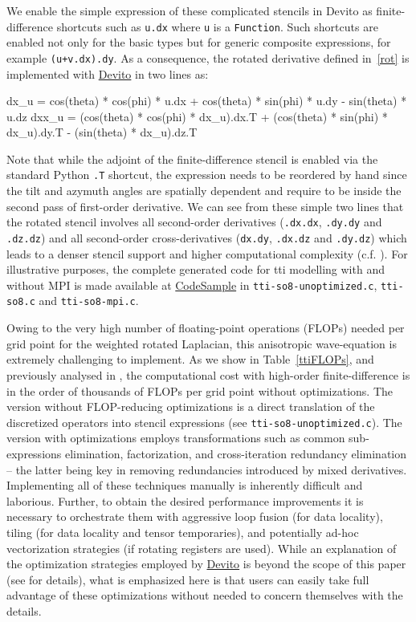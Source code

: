 \documentclass[10pt, conference]{IEEEtran}
\newcommand{\devito}{\href{https://github.com/devitocodes/devito}{Devito} }
\begin{document}
We enable the simple expression of these complicated stencils in Devito
as finite-difference shortcuts such as \texttt{u.dx} where \texttt{u} is
a \texttt{Function}. Such shortcuts are enabled not only for the basic
types but for generic composite expressions, for example
\texttt{(u\phantom{\ }+\phantom{\ }v.dx).dy}. As a consequence, the
rotated derivative defined in~\ref{rot} is implemented with \devito in two
lines as:

\begin{python}[label=rotxpy, caption=Rotated finite-difference with symbolic shortcuts]
dx_u = cos(theta) * cos(phi) * u.dx +
       cos(theta) * sin(phi) * u.dy -
       sin(theta) * u.dz
dxx_u = (cos(theta) * cos(phi) * dx_u).dx.T +
        (cos(theta) * sin(phi) * dx_u).dy.T -
        (sin(theta) * dx_u).dz.T
\end{python}

Note that while the adjoint of the finite-difference stencil is enabled via the
standard Python \texttt{.T} shortcut, the expression needs to be reordered by hand
since the tilt and azymuth angles are spatially dependent and require to be
inside the second pass of first-order derivative. We can see from these simple
two lines that the rotated stencil involves all second-order derivatives
(\texttt{.dx.dx}, \texttt{.dy.dy} and \texttt{.dz.dz}) and all second-order
cross-derivatives (\texttt{dx.dy}, \texttt{.dx.dz} and \texttt{.dy.dz}) which
leads to a denser stencil support and higher computational complexity
(c.f. \cite{louboutin2016ppf}). For illustrative purposes, the complete
generated code for tti modelling with and without MPI is made available
at \href{https://github.com/mloubout/SC20Paper/tree/master/codesamples}{CodeSample}
in \texttt{tti-so8-unoptimized.c}, \texttt{tti-so8.c} and \texttt{tti-so8-mpi.c}.

Owing to the very high number of floating-point operations (FLOPs) needed per
grid point for the weighted rotated Laplacian, this anisotropic wave-equation
is extremely challenging to implement. As we show in Table~\ref{ttiFLOPs}, and
previously analysed in \cite{louboutin2016ppf}, the computational cost with
high-order finite-difference is in the order of thousands of FLOPs per grid
point without optimizations. The version without FLOP-reducing optimizations is
a direct translation of the discretized operators into stencil expressions (see
\texttt{tti-so8-unoptimized.c}). The version with optimizations employs
transformations such as common sub-expressions elimination, factorization, and
cross-iteration redundancy elimination -- the latter being key in removing
redundancies introduced by mixed derivatives. Implementing all of these
techniques manually is inherently difficult and laborious. Further, to obtain
the desired performance improvements it is necessary to orchestrate them with
aggressive loop fusion (for data locality), tiling (for data locality and
tensor temporaries), and potentially ad-hoc vectorization strategies (if
rotating registers are used). While an explanation of the optimization
strategies employed by \devito is beyond the scope of this paper (see
\cite{devito-compiler} for details), what is emphasized here is that users
can easily take full advantage of these optimizations without needed to
concern themselves with the details.
\end{document}
